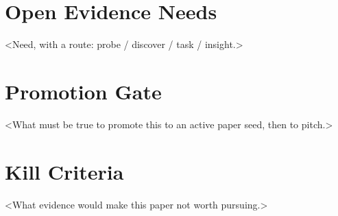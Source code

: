 \documentclass[11pt]{article}
\begin{document}
\section*{Open Evidence Needs}

<Need, with a route: probe / discover / task / insight.>

\section*{Promotion Gate}

<What must be true to promote this to an active paper seed, then to pitch.>

\section*{Kill Criteria}

<What evidence would make this paper not worth pursuing.>
\end{document}
